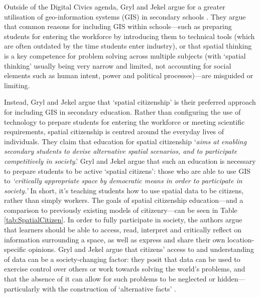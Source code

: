Outside of the Digital Civics agenda, Gryl and Jekel argue for a greater utilisation of geo-information systems (GIS) in secondary schools \citep{Gryl2012}. They argue that common reasons for including GIS within schools---such as preparing students for entering the workforce by introducing them to technical tools (which are often outdated by the time students enter industry), or that spatial thinking is a key competence for problem solving across multiple subjects (with `spatial thinking' usually being very narrow and limited, not accounting for social elements such as human intent, power and political processes)---are misguided or limiting. 

Instead, Gryl and Jekel argue that `spatial citizenship' is their preferred approach for including GIS in secondary education. Rather than configuring the use of technology to prepare students for entering the workforce or meeting scientific requirements, spatial citizenship is centred around the everyday lives of individuals. They claim that education for spatial citizenship `\textit{aims at enabling secondary students to devise alternative spatial scenarios, and to participate competitively in society}.' Gryl and Jekel argue that such an education is necessary to prepare students to be active `spatial citizens': those who are able to use GIS to \textit{`critically appropriate space by democratic means in order to participate in society.’} In short, it's teaching students how to use spatial data to be citizens, rather than simply workers. The goals of spatial citizenship education---and a comparison to previously existing models of citizenry---can be seen in Table \ref{tab:SpatialCitizen}. In order to fully participate in society, the authors argue that learners should be able to access, read, interpret and critically reflect on information surrounding a space, as well as express and share their own location-specific opinions. Gryl and Jekel argue that citizens' access to and understanding of data can be a society-changing factor: they posit that data can be used to exercise control over others or work towards solving the world's problems, and that the absence of it can allow for such problems to be neglected or hidden---particularly with the construction of `alternative facts' \citep{gryl2018}. 


